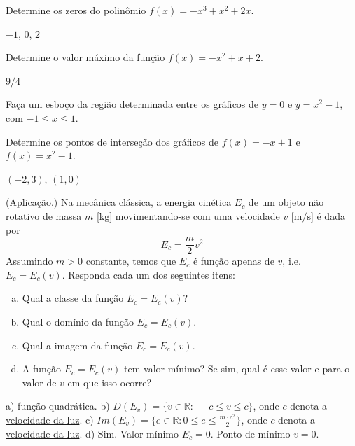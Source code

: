 \begin{exer}
  Determine os zeros do polinômio $f(x) = -x^3+x^2+2x$.
\end{exer}
\begin{resp}
  $-1$, $0$, $2$
\end{resp}

\begin{exer}
  Determine o valor máximo da função $f(x) = -x^2 + x + 2$.
\end{exer}
\begin{resp}
  $9/4$
\end{resp}

\begin{exer}
  Faça um esboço da região determinada entre os gráficos de $y=0$ e $y=x^2-1$, com $-1\leq x \leq 1$.
\end{exer}

\begin{exer}
  Determine os pontos de interseção dos gráficos de $f(x)=-x+1$ e $f(x)=x^2-1$. 
\end{exer}
\begin{resp}
  $(-2,3)$, $(1,0)$
\end{resp}

\begin{exer}(Aplicação.)
  Na \href{https://pt.wikipedia.org/wiki/Mec\%C3\%A2nica\_cl\%C3\%A1ssica}{mecânica clássica}, a \href{https://pt.wikipedia.org/wiki/Energia_cin\%C3\%A9tica}{energia cinética} $E_c$ de um objeto não rotativo de massa $m$ [$\text{kg}$] movimentando-se com uma velocidade $v$ [$\text{m}/\text{s}$] é dada por
  \begin{equation}
    E_c = \frac{m}{2}v^2
  \end{equation}
  Assumindo $m>0$ constante, temos que $E_c$ é função apenas de $v$, i.e. $E_c = E_c(v)$. Responda cada um dos seguintes itens:
  \begin{enumerate}[a)]
  \item Qual a classe da função $E_c = E_c(v)$?
  \item Qual o domínio da função $E_c = E_c(v)$.
  \item Qual a imagem da função $E_c = E_c(v)$.
  \item A função $E_c=E_c(v)$ tem valor mínimo? Se sim, qual é esse valor e para o valor de $v$ em que isso ocorre?
  \end{enumerate}
\end{exer}
\begin{resp}
  a) função quadrática. b) $D(E_v) = \{v\in \mathbb{R}:~-c\leq v\leq c\}$, onde $c$ denota a \href{https://pt.wikipedia.org/wiki/Velocidade\_da\_luz}{velocidade da luz}. c) $Im(E_v) = \{e\in \mathbb{R}: 0\leq e\leq \frac{m\cdot c^2}{2}\}$, onde $c$ denota a \href{https://pt.wikipedia.org/wiki/Velocidade\_da\_luz}{velocidade da luz}. d) Sim. Valor mínimo $E_c=0$. Ponto de mínimo $v=0$.
\end{resp}

